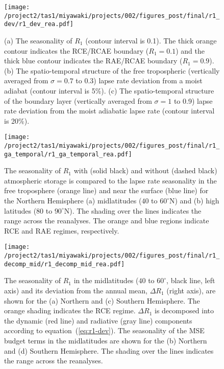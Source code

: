 \documentclass{ametsocV5}
\begin{document}
\begin{figure}[t]
  \centering
  \noindent\texttt{[image: /project2/tas1/miyawaki/projects/002/figures\_post/final/r1\_dev/r1\_dev\_rea.pdf]}\\
  \caption{(a) The seasonality of $R_{1}$ (contour interval is 0.1). The thick orange contour indicates the RCE/RCAE boundary ($R_1=0.1$) and the thick blue contour indicates the RAE/RCAE boundary ($R_1 = 0.9$). (b) The spatio-temporal structure of the free tropospheric (vertically averaged from $\sigma=0.7$ to 0.3) lapse rate deviation from a moist adiabat (contour interval is 5\%). (c) The spatio-temporal structure of the boundary layer (vertically averaged from $\sigma=1$ to 0.9) lapse rate deviation from the moist adiabatic lapse rate (contour interval is 20\%).}
  \label{fig:rea-r1-dev}
\end{figure}

\begin{figure}[t]
  \noindent\texttt{[image: /project2/tas1/miyawaki/projects/002/figures\_post/final/r1\_ga\_temporal/r1\_ga\_temporal\_rea.pdf]}\\
  \caption{The seasonality of $R_1$ with (solid black) and without (dashed black) atmospheric storage is compared to the lapse rate seasonality in the free troposphere (orange line) and near the surface (blue line) for the Northern Hemisphere (a) midlatitudes ($40$ to $60^\circ$N) and (b) high latitudes ($80$ to $90^\circ$N). The shading over the lines indicates the range across the reanalyses. The orange and blue regions indicate RCE and RAE regimes, respectively.}
  \label{fig:rea-r1-ga-temporal}
\end{figure}

\begin{figure}[t]
  \noindent\texttt{[image: /project2/tas1/miyawaki/projects/002/figures\_post/final/r1\_decomp\_mid/r1\_decomp\_mid\_rea.pdf]}\\
  \caption{The seasonality of $R_{1}$ in the midlatitudes ($40$ to $60^{\circ}$, black line, left axis) and its deviation from the annual mean, $\Delta R_1$ (right axis), are shown for the (a) Northern and (c) Southern Hemisphere. The orange shading indicates the RCE regime. $\Delta R_1$ is decomposed into the dynamic (red line) and radiative (gray line) components according to equation~(\ref{eq:r1-dev}). The seasonality of the MSE budget terms in the midlatitudes are shown for the (b) Northern and (d) Southern Hemisphere. The shading over the lines indicates the range across the reanalyses.}
  \label{fig:rea-r1-decomp-mid}
\end{figure}
\end{document}
